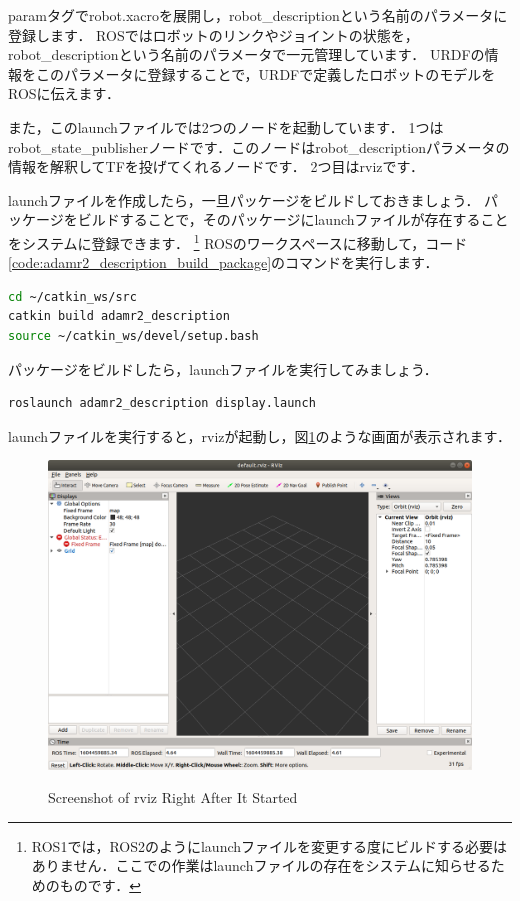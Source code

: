 \documentclass[{../../master}]{subfiles}
\begin{document}
\textsf{param}タグで\textsf{robot.xacro}を展開し，\textsf{robot\_description}という名前のパラメータに登録します．
ROSではロボットのリンクやジョイントの状態を，\textsf{robot\_description}という名前のパラメータで一元管理しています．
URDFの情報をこのパラメータに登録することで，URDFで定義したロボットのモデルをROSに伝えます．

また，このlaunchファイルでは2つのノードを起動しています．
1つは\textsf{robot\_state\_publisher}ノードです．このノードは\textsf{robot\_description}パラメータの情報を解釈してTFを投げてくれるノードです．
2つ目は\textsf{rviz}です．

launchファイルを作成したら，一旦パッケージをビルドしておきましょう．
パッケージをビルドすることで，そのパッケージにlaunchファイルが存在することをシステムに登録できます．
\footnote{ROS1では，ROS2のようにlaunchファイルを変更する度にビルドする必要はありません．ここでの作業はlaunchファイルの存在をシステムに知らせるためのものです．}
ROSのワークスペースに移動して，コード\ref{code:adamr2_description_build_package}のコマンドを実行します．

\begin{lstlisting}[language=sh, label=code:adamr2_description_build_package, caption=Build \textsf{adamr2\_description} Package]
cd ~/catkin_ws/src
catkin build adamr2_description
source ~/catkin_ws/devel/setup.bash 
\end{lstlisting}

パッケージをビルドしたら，launchファイルを実行してみましょう．

\begin{lstlisting}[language=sh, caption=Launch \textsf{display.launch}]
roslaunch adamr2_description display.launch
\end{lstlisting}

launchファイルを実行すると，\textsf{rviz}が起動し，図\ref{fig:plain_rviz}のような画面が表示されます．

\begin{figure}[ht]
  \centering
  \includegraphics[width=100truemm]{images/plain_rviz.png}
  \label{fig:plain_rviz}
  \caption{Screenshot of \textsf{rviz} Right After It Started}
\end{figure}
\end{document}

